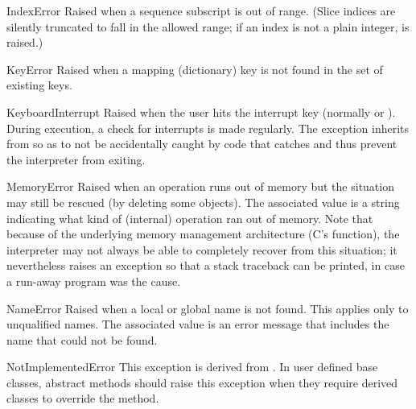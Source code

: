 \begin{excdesc}{IndexError}
  Raised when a sequence subscript is out of range.  (Slice indices are
  silently truncated to fall in the allowed range; if an index is not a
  plain integer,  is raised.)
\end{excdesc}

\begin{excdesc}{KeyError}
  Raised when a mapping (dictionary) key is not found in the set of
  existing keys.
\end{excdesc}

\begin{excdesc}{KeyboardInterrupt}
  Raised when the user hits the interrupt key (normally
   or ).  During execution, a check for
  interrupts is made regularly.
  The exception inherits from  so as to not be
  accidentally caught by code that catches  and thus
  prevent the interpreter from exiting.
\end{excdesc}

\begin{excdesc}{MemoryError}
  Raised when an operation runs out of memory but the situation may
  still be rescued (by deleting some objects).  The associated value is
  a string indicating what kind of (internal) operation ran out of memory.
  Note that because of the underlying memory management architecture
  (C's  function), the interpreter may not
  always be able to completely recover from this situation; it
  nevertheless raises an exception so that a stack traceback can be
  printed, in case a run-away program was the cause.
\end{excdesc}

\begin{excdesc}{NameError}
  Raised when a local or global name is not found.  This applies only
  to unqualified names.  The associated value is an error message that
  includes the name that could not be found.
\end{excdesc}

\begin{excdesc}{NotImplementedError}
  This exception is derived from .  In user
  defined base classes, abstract methods should raise this exception
  when they require derived classes to override the method.
\end{excdesc}

